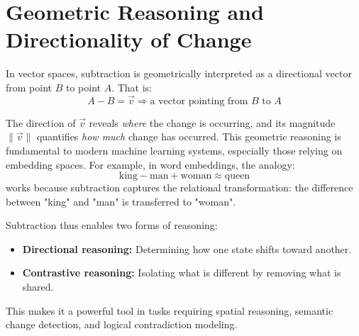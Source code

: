 \section{Geometric Reasoning and Directionality of Change}
In vector spaces, subtraction is geometrically interpreted as a directional vector from point $B$ to point $A$. That is:
\[
A - B = \vec{v} \Rightarrow \text{a vector pointing from } B \text{ to } A
\]

The direction of $\vec{v}$ reveals \emph{where} the change is occurring, and its magnitude $\|\vec{v}\|$ quantifies \emph{how much} change has occurred. This geometric reasoning is fundamental to modern machine learning systems, especially those relying on embedding spaces. For example, in word embeddings, the analogy:
\[
\text{king} - \text{man} + \text{woman} \approx \text{queen}
\]
works because subtraction captures the relational transformation: the difference between "king" and "man" is transferred to "woman".

Subtraction thus enables two forms of reasoning:
\begin{itemize}
	\item \textbf{Directional reasoning:} Determining how one state shifts toward another.
	\item \textbf{Contrastive reasoning:} Isolating what is different by removing what is shared.
\end{itemize}

This makes it a powerful tool in tasks requiring spatial reasoning, semantic change detection, and logical contradiction modeling.